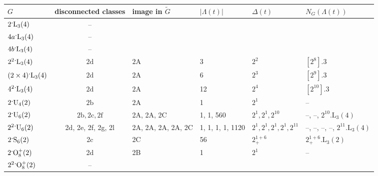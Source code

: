 \documentclass[11pt,a4paper]{amsart}
\theoremstyle{plain}
\theoremstyle{definition}
\theoremstyle{remark}
\theoremstyle{remark}
\theoremstyle{remark}
\theoremstyle{definition}
\newcommand{\ns}{\mathbin{\mspace{-4mu}\vcenter{\hbox{\raisebox{1ex}{$\cdot$}}}\mspace{-4mu}}}
\begin{document}
\begin{table}
\centering
\begin{tabular}{|l|c|l|l|l|l|}
\hline
$G$                   & disconnected classes                                   & image in $\widetilde{G}$                                          & $|\Lambda(t)|$                              & $\Delta(t)$                     & $N_G(\Lambda(t))$                    \\\hline
$2\ns\mathrm{L}_3(4)$           & --                                    &                    &                  &            &          \\
$4a\ns\mathrm{L}_3(4)$          & --                                    &                    &                  &            &          \\
$4b\ns\mathrm{L}_3(4)$          & --                                    &                    &                  &            &          \\
$2^2\ns\mathrm{L}_3(4)$         & $\mathrm{2d}$                         & $\mathrm{2A}$      & 3                & $2^2$      & $[2^8].3$          \\
$(2\times 4)\ns\mathrm{L}_3(4)$ & $\mathrm{2d}$                         & $\mathrm{2A}$      & 6                & $2^3$ &$[2^9].3$               \\
$4^2\ns\mathrm{L}_3(4)$         & $\mathrm{2d}$                         & $\mathrm{2A}$      & 12               & $2^4$ &$[2^{10}].3$                \\
$2\ns\mathrm{U}_4(2)$           & $\mathrm{2b}$                         & $\mathrm{2A}$      & 1                & $2^1$ &--                \\
$2\ns\mathrm{U}_6(2)$           & $\mathrm{2b},\mathrm{2c},\mathrm{2f}$ & 2A, 2A, 2C         & 1, 1, 560        & $2^1,2^1,2^{10}$     &--, --, $2^{10}.\mathrm{L}_3(4)$\\
$2^2\ns\mathrm{U}_6(2)$         & 2d, 2e, 2f, 2g, 2l                     & 2A, 2A, 2A, 2A, 2C & 1, 1, 1, 1, 1120 & $2^1,2^1,2^1,2^1,2^{11}$      &--, --, --, --, $2^{11}.\mathrm{L}_3(4)$         \\
$2\ns\mathrm{S}_6(2)$           & 2c                                    & 2C                 & 56               & $2_+^{1+6}$ &$2_+^{1+6}.\mathrm{L}_3(2)$\\
$2\ns\mathrm{O}_8^+(2)$                  & 2d                                  & 2B                 & 1                & $2^1$                &--\\
$2^2\ns\mathrm{O}_8^+(2)$                & --                                    &                    &                  &     &                 \\

\end{tabular}
\end{table}
\end{document}
